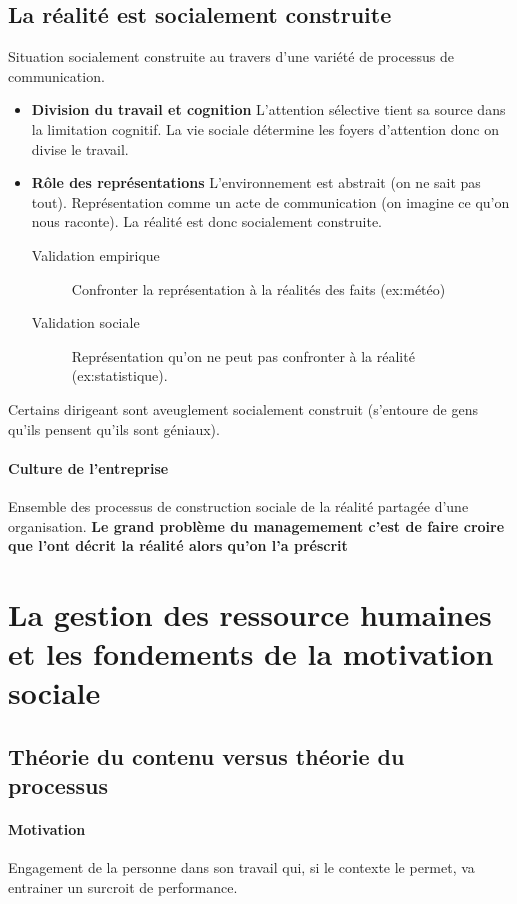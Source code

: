 \documentclass[11pt]{article} %
\begin{document}
\subsection{La réalité est socialement construite}
		Situation socialement construite au travers d'une variété de processus de communication. 
		\begin{itemize}
			\item \textbf{Division du travail et cognition} L'attention sélective tient sa source dans la limitation cognitif. La vie sociale détermine les foyers d'attention donc on divise le travail.
			\item \textbf{Rôle des représentations} L'environnement est abstrait (on ne sait pas tout). Représentation comme un acte de  communication (on imagine ce qu'on nous raconte). La réalité est donc socialement construite.
			\begin{description}
				\item[Validation empirique] Confronter la représentation à la réalités des faits (ex:météo)
				\item[Validation sociale] Représentation qu'on ne peut pas confronter à la réalité 		
				(ex:statistique).
			\end{description}
		\end{itemize}
		Certains dirigeant sont aveuglement socialement construit (s'entoure de gens qu'ils pensent qu'ils sont 	
		géniaux).
		\paragraph{Culture de l'entreprise} Ensemble des processus de construction sociale de la réalité 
		partagée d'une organisation.
		\textbf{Le grand problème du managemement  c'est de faire croire que l'ont décrit la réalité alors 
		qu'on l'a préscrit}


\section{La gestion des ressource humaines et les fondements de la motivation sociale}
	\subsection{Théorie du contenu versus théorie du processus}
		\paragraph{Motivation} Engagement de la personne dans son travail qui, si le contexte le permet, va entrainer un surcroit de performance.
\end{document}
